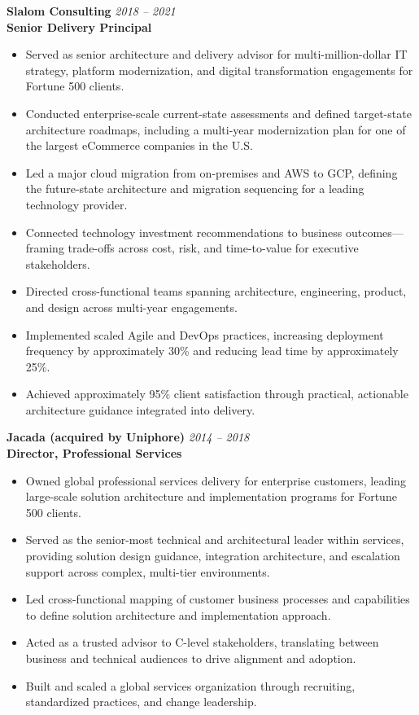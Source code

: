 \documentclass[11pt]{article}
\begin{document}
\vspace{6pt}

\pagebreak

\textbf{Slalom Consulting} \hfill \textit{2018 -- 2021} \\
\textbf{Senior Delivery Principal}

\begin{itemize}
  \item Served as senior architecture and delivery advisor for multi-million-dollar IT strategy, platform modernization, and digital transformation engagements for Fortune 500 clients.
  \item Conducted enterprise-scale current-state assessments and defined target-state architecture roadmaps, including a multi-year modernization plan for one of the largest eCommerce companies in the U.S.
  \item Led a major cloud migration from on-premises and AWS to GCP, defining the future-state architecture and migration sequencing for a leading technology provider.
  \item Connected technology investment recommendations to business outcomes---framing trade-offs across cost, risk, and time-to-value for executive stakeholders.
  \item Directed cross-functional teams spanning architecture, engineering, product, and design across multi-year engagements.
  \item Implemented scaled Agile and DevOps practices, increasing deployment frequency by approximately 30\% and reducing lead time by approximately 25\%.
  \item Achieved approximately 95\% client satisfaction through practical, actionable architecture guidance integrated into delivery.
\end{itemize}

\vspace{6pt}

\textbf{Jacada (acquired by Uniphore)} \hfill \textit{2014 -- 2018} \\
\textbf{Director, Professional Services}

\begin{itemize}
  \item Owned global professional services delivery for enterprise customers, leading large-scale solution architecture and implementation programs for Fortune 500 clients.
  \item Served as the senior-most technical and architectural leader within services, providing solution design guidance, integration architecture, and escalation support across complex, multi-tier environments.
  \item Led cross-functional mapping of customer business processes and capabilities to define solution architecture and implementation approach.
  \item Acted as a trusted advisor to C-level stakeholders, translating between business and technical audiences to drive alignment and adoption.
  \item Built and scaled a global services organization through recruiting, standardized practices, and change leadership.
\end{itemize}
\end{document}
